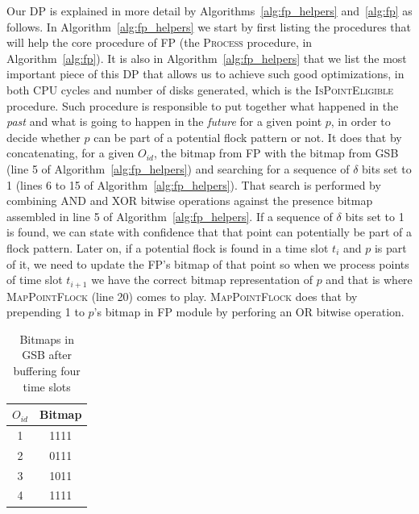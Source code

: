 Our DP is explained in more detail by Algorithms~\ref{alg:fp_helpers} and~\ref{alg:fp} as follows. In
Algorithm~\ref{alg:fp_helpers} we start by first listing the procedures that will help the core procedure of FP (the
\textsc{Process} procedure, in Algorithm~\ref{alg:fp}). It is also in Algorithm~\ref{alg:fp_helpers} that we list the
most important piece of this DP that allows us to achieve such good optimizations, in both CPU cycles and number of
disks generated, which is the \textsc{IsPointEligible} procedure. Such procedure is responsible to put together what
happened in the \textit{past} and what is going to happen in the \textit{future} for a given point $p$, in order to
decide whether $p$ can be part of a potential flock pattern or not. It does that by concatenating, for a given $O_{id}$,
the bitmap from FP with the bitmap from GSB (line 5 of Algorithm~\ref{alg:fp_helpers}) and searching for a sequence of
$\delta$ bits set to 1 (lines 6 to 15 of Algorithm~\ref{alg:fp_helpers}). That search is performed by combining AND and
XOR bitwise operations against the presence bitmap assembled in line 5 of Algorithm~\ref{alg:fp_helpers}. If a sequence
of $\delta$ bits set to 1 is found, we can state with confidence that that point can potentially be part of a flock
pattern. Later on, if a potential flock is found in a time slot $t_i$ and $p$ is part of it, we need to update the FP's
bitmap of that point so when we process points of time slot $t_{i+1}$ we have the correct bitmap representation of $p$
and that is where \textsc{MapPointFlock} (line 20) comes to play. \textsc{MapPointFlock} does that by prepending 1 to
$p$'s bitmap in FP module by perforing an OR bitwise operation.

\begin{table}
    \renewcommand{\arraystretch}{1.3}
    \caption{Bitmaps in GSB after buffering four time slots}
    \label{tab:bitmaps}
    \centering
    \begin{tabular}{c|c}
        \hline
        $O_{id}$ &   Bitmap\\
        \hline
        \hline
        1        &   1111\\
        \hline
        2        &   0111\\
        \hline
        3        &   1011\\
        \hline
        4        &   1111\\
        \hline
    \end{tabular}
\end{table}

